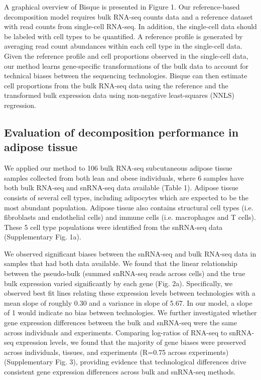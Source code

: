 A graphical overview of Bisque is presented in Figure 1. Our reference-based decomposition model requires bulk RNA-seq counts data and a reference dataset with read counts from single-cell RNA-seq. In addition, the single-cell data should be labeled with cell types to be quantified. A reference profile is generated by averaging read count abundances within each cell type in the single-cell data. Given the reference profile and cell proportions observed in the single-cell data, our method learns gene-specific transformations of the bulk data to account for technical biases between the sequencing technologies. Bisque can then estimate cell proportions from the bulk RNA-seq data using the reference and the transformed bulk expression data using non-negative least-squares (NNLS) regression. 

\subsection{Evaluation of decomposition performance in adipose tissue}
We applied our method to 106 bulk RNA-seq subcutaneous adipose tissue samples collected from both lean and obese individuals, where 6 samples have both bulk RNA-seq and snRNA-seq data available (Table 1). Adipose tissue consists of several cell types, including adipocytes which are expected to be the most abundant population. Adipose tissue also contains structural cell types (i.e. fibroblasts and endothelial cells) and immune cells (i.e. macrophages and T cells)\cite{Esteve_Rafols2014-ia}. These 5 cell type populations were identified from the snRNA-seq data (Supplementary Fig. 1a).

We observed significant biases between the snRNA-seq and bulk RNA-seq data in samples that had both data available. We found that the linear relationship between the pseudo-bulk (summed snRNA-seq reads across cells) and the true bulk expression varied significantly by each gene (Fig. 2a). Specifically, we observed best fit lines relating these expression levels between technologies with a mean slope of roughly 0.30 and a variance in slope of 5.67. In our model, a slope of 1 would indicate no bias between technologies. We further investigated whether gene expression differences between the bulk and snRNA-seq were the same across individuals and experiments. Comparing log-ratios of RNA-seq to snRNA-seq expression levels, we found that the majority of gene biases were preserved across individuals, tissues, and experiments (R=0.75 across experiments) (Supplementary Fig. 3), providing evidence that technological differences drive consistent gene expression differences across bulk and snRNA-seq methods. 

